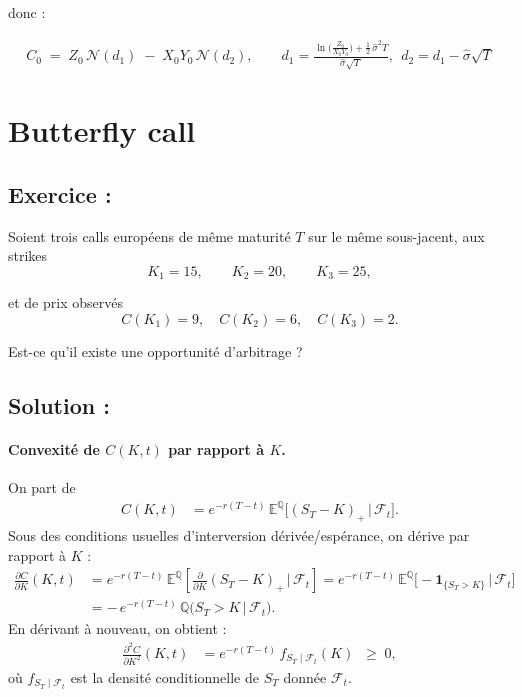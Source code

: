 donc : 

\begin{align*}
\boxed{\;
C_0 \;=\; Z_0\,\mathcal{N}(d_1) \;-\; X_0Y_0\,\mathcal{N}(d_2),\qquad
d_1=\frac{\ln\!\big(\tfrac{Z_0}{X_0Y_0}\big)+\tfrac12\,\hat{\sigma}^2 T}{\hat{\sigma}\sqrt{T}},
\ \ d_2=d_1-\hat{\sigma}\sqrt{T}\; } 
\end{align*}


\section{Butterfly call}

\subsection*{Exercice :}

\begin{exerciseBox}
Soient trois calls européens de même maturité $T$ sur le même sous-jacent, aux strikes
\[
K_1=15,\qquad K_2=20,\qquad K_3=25,
\]

et de prix observés
\[
C(K_1)=9,\quad C(K_2)=6,\quad C(K_3)=2.
\]

Est-ce qu'il existe une opportunité d'arbitrage ?

\end{exerciseBox}

\subsection*{Solution :}


\paragraph{Convexité de $C(K,t)$ par rapport à $K$.}
On part de
\begin{align*}
C(K,t)
&= e^{-r(T-t)}\,\mathbb{E}^{\mathbb{Q}}\!\big[(S_T - K)_+ \,\big|\, \mathcal{F}_t\big].
\end{align*}
Sous des conditions usuelles d'interversion dérivée/espérance,
on dérive par rapport à $K$ :
\begin{align*}
\frac{\partial C}{\partial K}(K,t)
&= e^{-r(T-t)}\,\mathbb{E}^{\mathbb{Q}}\!\left[\frac{\partial}{\partial K}(S_T-K)_+ \,\Big|\, \mathcal{F}_t\right]
= e^{-r(T-t)}\,\mathbb{E}^{\mathbb{Q}}\!\big[-\mathbf{1}_{\{S_T>K\}} \,\big|\, \mathcal{F}_t\big] \\
&= -\,e^{-r(T-t)}\,\mathbb{Q}\!\big(S_T>K \,\big|\, \mathcal{F}_t\big).
\end{align*}
En dérivant à nouveau, on obtient :
\begin{align*}
\frac{\partial^2 C}{\partial K^2}(K,t)
&= e^{-r(T-t)}\, f_{S_T\mid \mathcal{F}_t}(K)
\;\;\ge\; 0,
\end{align*}
où $f_{S_T\mid \mathcal{F}_t}$ est la densité conditionnelle de $S_T$ donnée $\mathcal{F}_t$.



